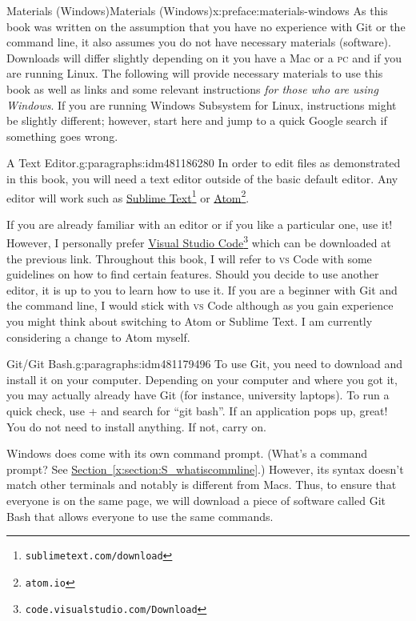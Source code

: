 \documentclass[oneside,10pt,]{book}
\newcommand{\xreffont}{\relax}
\newcommand{\initialism}[1]{\textsc{\MakeLowercase{#1}}}
\newcommand{\kbd}[1]{\keys{{#1}}}
\begin{document}
\begin{preface}{Materials (Windows)}{}{Materials (Windows)}{}{}{x:preface:materials-windows}
As this book was written on the assumption that you have no experience with Git or the command line, it also assumes you do not have necessary materials (software). Downloads will differ slightly depending on it you have a Mac or a \initialism{PC} and if you are running Linux. The following will provide necessary materials to use this book as well as links and some relevant instructions \emph{for those who are using Windows}. If you are running Windows Subsystem for Linux, instructions might be slightly different; however, start here and jump to a quick Google search if something goes wrong.%
\begin{paragraphs}{A Text Editor.}{g:paragraphs:idm481186280}%
In order to edit files as demonstrated in this book, you will need a text editor outside of the basic default editor. Any editor will work such as \href{https://www.sublimetext.com/download}{Sublime Text}\footnote{\nolinkurl{sublimetext.com/download}\label{g:fn:idm481181672}} or \href{https://atom.io}{Atom}\footnote{\nolinkurl{atom.io}\label{g:fn:idm481178984}}.%
\par
If you are already familiar with an editor or if you like a particular one, use it! However, I personally prefer \href{}{Visual Studio Code}\footnote{\nolinkurl{code.visualstudio.com/Download}\label{g:fn:idm481183592}} which can be downloaded at the previous link. Throughout this book, I will refer to \initialism{VS} Code with some guidelines on how to find certain features. Should you decide to use another editor, it is up to you to learn how to use it. If you are a beginner with Git and the command line, I would stick with \initialism{VS} Code although as you gain experience you might think about switching to Atom or Sublime Text. I am currently considering a change to Atom myself.%
\end{paragraphs}%
\begin{paragraphs}{Git\slash{}Git Bash.}{g:paragraphs:idm481179496}%
To use Git, you need to download and install it on your computer. Depending on your computer and where you got it, you may actually already have Git (for instance, university laptops). To run a quick check, use \kbd{Windows} + \kbd{S} and search for ``git bash''. If an application pops up, great! You do not need to install anything. If not, carry on.%
\par
Windows does come with its own command prompt. (What's a command prompt? See \hyperref[x:section:S_whatiscommline]{Section~{\xreffont\ref{x:section:S_whatiscommline}}}.) However, its syntax doesn't match other terminals and notably is different from Macs. Thus, to ensure that everyone is on the same page, we will download a piece of software called Git Bash that allows everyone to use the same commands.%

\end{paragraphs}
\end{preface}
\end{document}
